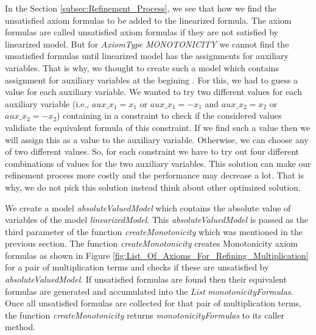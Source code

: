 \noindent In the Section \ref{subsec:Refinement_Process}, we see that how we find the unsatisfied axiom formulas to be added to the linearized formula.
The axiom formulas are called unsatisfied axiom formulas if they are not satisfied by linearized model.
But for \textit{AxiomType} \textit{MONOTONICITY} we cannot find the unsatisfied formulas until linearized model has the assignments for auxiliary variables.
That is why, we thought to create such a model which contains assignment for auxiliary variables  at the begining .
For this, we had to guess a value for each auxiliary variable.
We wanted to try two different values for each auxiliary variable (i.e., $aux\_x_{1} = x_{1}$ or $aux\_x_{1} = -x_{1}$ and $aux\_x_{2} = x_{2}$ or $aux\_x_{2} = -x_{2}$) containing in a constraint to check if the considered values validiate the equivalent formula of this constraint.
If we find such a value then we will assign this as a value to the auxiliary variable.
Otherwise, we can choose any of two different values.
So, for each constraint we have to try out four different combinations of values for the two auxiliary variables.
This solution can make our refinement process more costly and the performance may decrease a lot.
That is why, we do not pick this solution instead think about other optimized solution.\newline

\noindent We create a model \textit{absoluteValuedModel} which contains the absolute value of variables of the model \textit{linearizedModel}.
This \textit{absoluteValuedModel} is passed as the third parameter of the function \textit{createMonotonicity} which was mentioned in the previous section.
The function \textit{createMonotonicity} creates Monotonicity axiom formulas as shown in Figure \ref{fig:List_Of_Axioms_For_Refining_Multiplication} for a pair of multiplication terms and checks if these are unsatisfied by \textit{absoluteValuedModel}.
If unsatisfied formulas are found then their equivalent formulas are generated and accumulated into the \textit{List} \textit{monotonicityFormulas}.
Once all unsatisfied formulas are collected for that pair of multiplication terms, the function \textit{createMonotonicity} returns \textit{monotonicityFormulas} to its caller method.
